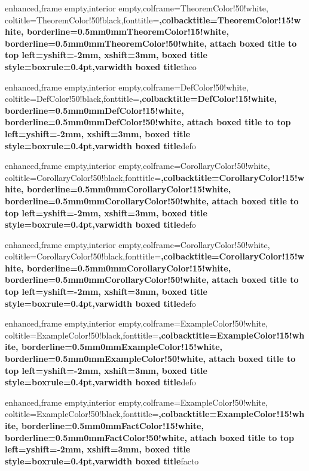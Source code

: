 %
{enhanced,frame empty,interior empty,colframe=TheoremColor!50!white,
	coltitle=TheoremColor!50!black,fonttitle=\bfseries,colbacktitle=TheoremColor!15!white,
	borderline={0.5mm}{0mm}{TheoremColor!15!white},
	borderline={0.5mm}{0mm}{TheoremColor!50!white},
	attach boxed title to top left={yshift=-2mm, xshift=3mm},
	boxed title style={boxrule=0.4pt},varwidth boxed title}{theo}

%
{enhanced,frame empty,interior empty,colframe=DefColor!50!white,
	coltitle=DefColor!50!black,fonttitle=\bfseries,colbacktitle=DefColor!15!white,
	borderline={0.5mm}{0mm}{DefColor!15!white},
	borderline={0.5mm}{0mm}{DefColor!50!white},
	attach boxed title to top left={yshift=-2mm, xshift=3mm},
	boxed title style={boxrule=0.4pt},varwidth boxed title}{defo}

%
{enhanced,frame empty,interior empty,colframe=CorollaryColor!50!white,
	coltitle=CorollaryColor!50!black,fonttitle=\bfseries,colbacktitle=CorollaryColor!15!white,
	borderline={0.5mm}{0mm}{CorollaryColor!15!white},
	borderline={0.5mm}{0mm}{CorollaryColor!50!white},
	attach boxed title to top left={yshift=-2mm, xshift=3mm},
	boxed title style={boxrule=0.4pt},varwidth boxed title}{defo}
 
%
{enhanced,frame empty,interior empty,colframe=CorollaryColor!50!white,
	coltitle=CorollaryColor!50!black,fonttitle=\bfseries,colbacktitle=CorollaryColor!15!white,
	borderline={0.5mm}{0mm}{CorollaryColor!15!white},
	borderline={0.5mm}{0mm}{CorollaryColor!50!white},
	attach boxed title to top left={yshift=-2mm, xshift=3mm},
	boxed title style={boxrule=0.4pt},varwidth boxed title}{defo}
 
%
{enhanced,frame empty,interior empty,colframe=ExampleColor!50!white,
	coltitle=ExampleColor!50!black,fonttitle=\bfseries,colbacktitle=ExampleColor!15!white,
	borderline={0.5mm}{0mm}{ExampleColor!15!white},
	borderline={0.5mm}{0mm}{ExampleColor!50!white},
	attach boxed title to top left={yshift=-2mm, xshift=3mm},
	boxed title style={boxrule=0.4pt},varwidth boxed title}{defo}


%
{enhanced,frame empty,interior empty,colframe=ExampleColor!50!white,
	coltitle=ExampleColor!50!black,fonttitle=\bfseries,colbacktitle=ExampleColor!15!white,
	borderline={0.5mm}{0mm}{FactColor!15!white},
	borderline={0.5mm}{0mm}{FactColor!50!white},
	attach boxed title to top left={yshift=-2mm, xshift=3mm},
	boxed title style={boxrule=0.4pt},varwidth boxed title}{facto}